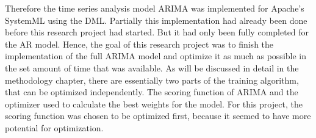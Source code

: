 Therefore the time series analysis model \acs{ARIMA} was implemented for Apache's SystemML using the \acl{DML}. Partially this implementation had already been done before this research project had started. But it had only been fully completed for the \acl{AR} model. Hence, the goal of this research project was to finish the implementation of the full \acl{ARIMA} model and optimize it as much as possible in the set amount of time that was available. As will be discussed in detail in the methodology chapter, there are essentially two parts of the training algorithm, that can be optimized independently. The scoring function of \acs{ARIMA} and the optimizer used to calculate the best weights for the model. For this project, the scoring function was chosen to be optimized first, because it seemed to have more potential for optimization.
